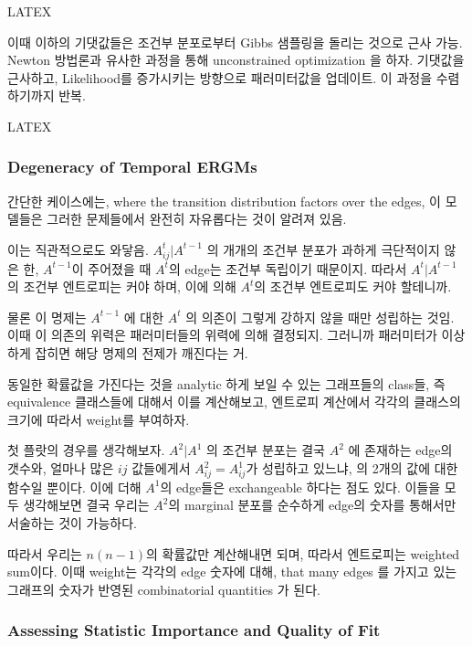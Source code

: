 \documentclass[
]{book}
\begin{document}
{{{LATEX

이때 이하의 기댓값들은 조건부 분포로부터 Gibbs 샘플링을 돌리는 것으로 근사 가능. Newton 방법론과 유사한 과정을 통해 unconstrained optimization 을 하자. 기댓값을 근사하고, Likelihood를 증가시키는 방향으로 패러미터값을 업데이트. 이 과정을 수렴하기까지 반복.

LATEX

\hypertarget{degeneracy-of-temporal-ergms}{%
\subsubsection{Degeneracy of Temporal ERGMs}\label{degeneracy-of-temporal-ergms}}

간단한 케이스에는, where the transition distribution factors over the edges, 이 모델들은 그러한 문제들에서 완전히 자유롭다는 것이 알려져 있음.

이는 직관적으로도 와닿음. \(A^t_{ij} | A^{t−1}\) 의 개개의 조건부 분포가 과하게 극단적이지 않은 한, \(A^{t-1}\)이 주어졌을 때 \(A^t\)의 edge는 조건부 독립이기 때문이지. 따라서 \(A^t | A^{t−1}\) 의 조건부 엔트로피는 커야 하며, 이에 의해 \(A^t\)의 조건부 엔트로피도 커야 할테니까.

물론 이 명제는 \(A^{t−1}\) 에 대한 \(A^t\) 의 의존이 그렇게 강하지 않을 때만 성립하는 것임. 이때 이 의존의 위력은 패러미터들의 위력에 의해 결정되지. 그러니까 패러미터가 이상하게 잡히면 해당 명제의 전제가 깨진다는 거.

동일한 확률값을 가진다는 것을 analytic 하게 보일 수 있는 그래프들의 class들, 즉 equivalence 클래스들에 대해서 이를 계산해보고, 엔트로피 계산에서 각각의 클래스의 크기에 따라서 weight를 부여하자.

첫 플랏의 경우를 생각해보자. \(A^2 | A^1\) 의 조건부 분포는 결국 \(A^2\) 에 존재하는 edge의 갯수와, 얼마나 많은 \(ij\) 값들에게서 \(A^2_{ij} = A^1_{ij}\)가 성립하고 있느냐, 의 2개의 값에 대한 함수일 뿐이다. 이에 더해 \(A^1\)의 edge들은 exchangeable 하다는 점도 있다. 이들을 모두 생각해보면 결국 우리는 \(A^2\)의 marginal 분포를 순수하게 edge의 숫자를 통해서만 서술하는 것이 가능하다.

따라서 우리는 \(n(n − 1)\)의 확률값만 계산해내면 되며, 따라서 엔트로피는 weighted sum이다. 이때 weight는 각각의 edge 숫자에 대해, that many edges 를 가지고 있는 그래프의 숫자가 반영된 combinatorial quantities 가 된다.

\hypertarget{assessing-statistic-importance-and-quality-of-fit}{%
\subsubsection{Assessing Statistic Importance and Quality of Fit}\label{assessing-statistic-importance-and-quality-of-fit}}

}}}
\end{document}
